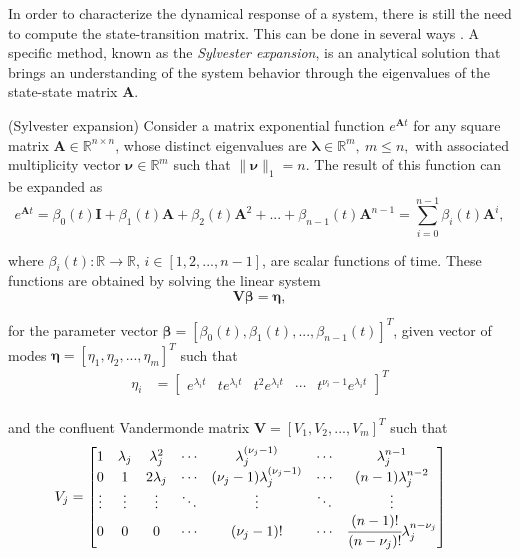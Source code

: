 \documentclass[a4paper,11pt]{book}
\numberwithin{figure}{chapter}
\numberwithin{equation}{chapter}
\numberwithin{table}{chapter}
\newtheorem{theorem}{Theorem}[chapter]
\theoremstyle{definition}
\newcounter{boxed-theorem}
\newenvironment{boxed-theorem}[1]
{\colorlet{shadecolor}{pastelBlue2!5} \begin{shaded} \begin{theorem}{#1}}
{\end{theorem} \end{shaded}}
\newcounter{boxed-lemma}
\newcounter{boxed-definition}
\newcounter{boxed-example}
\begin{document}
In order to characterize the dynamical response of a system, there is still the need to compute the state-transition matrix. This can be done in several ways \cite{Moler_VanLoan:2003}. A specific method, known as the \textit{Sylvester expansion}, is an analytical solution that brings an understanding of the system behavior through the eigenvalues of the state-state matrix $\bm{A}$.

\begin{boxed-theorem}{(Sylvester expansion)} \label{th:sylvester01}
    Consider a matrix exponential function $e^{\bm{A} t}$ for any square matrix $\bm{A} \in \mathbb{R}^{n \times n}$, whose distinct eigenvalues are $\bm{\lambda} \in \mathbb{R}^{m},\ m \leq n,$ with associated multiplicity vector $\bm{\nu} \in \mathbb{R}^m$ such that $\| \bm{\nu} \|_1 = n$. The result of this function can be expanded as
    \begin{equation} \label{eq:sylvester01}
        e^{\bm{A} t} = \beta_0(t) \bm{I} + \beta_1(t) \bm{A} + \beta_2(t) \bm{A}^2 + ... + \beta_{n-1}(t) \bm{A}^{n-1} = \sum_{i=0}^{n-1} \beta_i(t) \bm{A}^i
    ,\end{equation} 
    
    \noindent where $\beta_i(t) : \mathbb{R} \rightarrow \mathbb{R}$, $i \in [1,2,...,n-1]$, are scalar functions of time. These functions are obtained by solving the linear system
    \begin{equation} \label{eq:sylvester02}
        \bm{V} \bm{\beta} = \bm{\eta}
    ,\end{equation} 
    
    \noindent for the parameter vector $\bm{\beta} = [\beta_0(t), \beta_1(t), ..., \beta_{n-1}(t)]^T$, given vector of modes $\bm{\eta} = [\eta_1, \eta_2, ..., \eta_m]^T$ such that
    \begin{align*}
        \eta_i & = \begin{bmatrix} e^{\lambda_i t} & te^{\lambda_i t} & t^2e^{\lambda_i t} & \cdots & t^{\nu_i-1}e^{\lambda_i t} \end{bmatrix}^T \\
    \end{align*}
    
	\noindent and the confluent Vandermonde matrix $\bm{V} = [V_1, V_2, ..., V_m]^T$ such that
    \begin{align*}
        V_j     & = \begin{bmatrix}
            1 & \lambda_j & \lambda_j^2 & \cdots & \lambda_j^{(\nu_j - 1)} & \cdots & \lambda_j^{n-1} \\
            0 & 1 & 2\lambda_j & \cdots & (\nu_j - 1) \lambda_j^{(\nu_j - 1)} & \cdots & (n-1)\lambda_j^{n-2} \\
            \vdots & \vdots & \vdots & \ddots & \vdots & \ddots & \vdots \\
            0 & 0 & 0 & \cdots & (\nu_j - 1)! & \cdots & \cfrac{(n - 1)!}{(n - \nu_j)!}\lambda_j^{n-\nu_j} \\
        \end{bmatrix}\
    \end{align*} 
\end{boxed-theorem}
\end{document}
